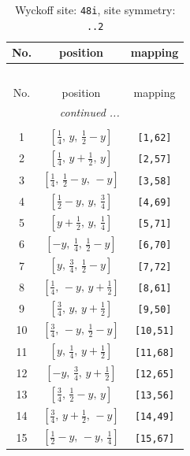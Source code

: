 \documentclass[fleqn,8pt]{jsarticle}
\begin{document}
\renewcommand{\arraystretch}{1.2}
\begin{longtable}{ccc}
\caption{Wyckoff site: {\tt 48i}, site symmetry: {\tt ..2}}
 \\
 \hline \hline
No. & position & mapping \\ \hline \endfirsthead

\multicolumn{2}{l}{\tablename\ \thetable{}} \\
 \hline \hline
No. & position & mapping \\ \hline \endhead

 \hline \hline
\multicolumn{2}{r}{\footnotesize\it continued ...} \\ \endfoot

 \hline \hline
\multicolumn{2}{r}{} \\ \endlastfoot

1 & $\left[ \frac{1}{4},\, y,\, \frac{1}{2} - y \right]$ & {\tt [1,62]} \\ \hline
2 & $\left[ \frac{1}{4},\, y + \frac{1}{2},\, y \right]$ & {\tt [2,57]} \\ \hline
3 & $\left[ \frac{1}{4},\, \frac{1}{2} - y,\, - y \right]$ & {\tt [3,58]} \\ \hline
4 & $\left[ \frac{1}{2} - y,\, y,\, \frac{3}{4} \right]$ & {\tt [4,69]} \\ \hline
5 & $\left[ y + \frac{1}{2},\, y,\, \frac{1}{4} \right]$ & {\tt [5,71]} \\ \hline
6 & $\left[ - y,\, \frac{1}{4},\, \frac{1}{2} - y \right]$ & {\tt [6,70]} \\ \hline
7 & $\left[ y,\, \frac{3}{4},\, \frac{1}{2} - y \right]$ & {\tt [7,72]} \\ \hline
8 & $\left[ \frac{1}{4},\, - y,\, y + \frac{1}{2} \right]$ & {\tt [8,61]} \\ \hline
9 & $\left[ \frac{3}{4},\, y,\, y + \frac{1}{2} \right]$ & {\tt [9,50]} \\ \hline
10 & $\left[ \frac{3}{4},\, - y,\, \frac{1}{2} - y \right]$ & {\tt [10,51]} \\ \hline
11 & $\left[ y,\, \frac{1}{4},\, y + \frac{1}{2} \right]$ & {\tt [11,68]} \\ \hline
12 & $\left[ - y,\, \frac{3}{4},\, y + \frac{1}{2} \right]$ & {\tt [12,65]} \\ \hline
13 & $\left[ \frac{3}{4},\, \frac{1}{2} - y,\, y \right]$ & {\tt [13,56]} \\ \hline
14 & $\left[ \frac{3}{4},\, y + \frac{1}{2},\, - y \right]$ & {\tt [14,49]} \\ \hline
15 & $\left[ \frac{1}{2} - y,\, - y,\, \frac{1}{4} \right]$ & {\tt [15,67]} \\ \hline

\end{longtable}
\end{document}
